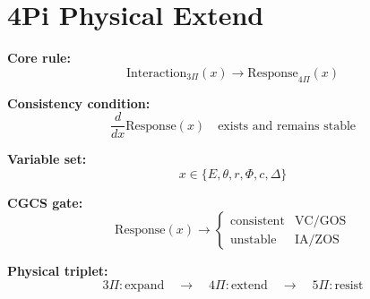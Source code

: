 \section*{4Pi Physical Extend}

\textbf{Core rule:}
\[
\mathrm{Interaction}_{3\Pi}(x)
\rightarrow
\mathrm{Response}_{4\Pi}(x)
\]

\textbf{Consistency condition:}
\[
\frac{d}{dx}\mathrm{Response}(x)
\quad \text{exists and remains stable}
\]

\textbf{Variable set:}
\[
x \in \{E,\theta,r,\Phi,c,\Delta\}
\]

\textbf{CGCS gate:}
\[
\mathrm{Response}(x) \rightarrow
\begin{cases}
\mathrm{consistent} & \text{VC/GOS} \\
\mathrm{unstable} & \text{IA/ZOS}
\end{cases}
\]

\textbf{Physical triplet:}
\[
3\Pi:\mathrm{expand}
\quad\rightarrow\quad
4\Pi:\mathrm{extend}
\quad\rightarrow\quad
5\Pi:\mathrm{resist}
\]
